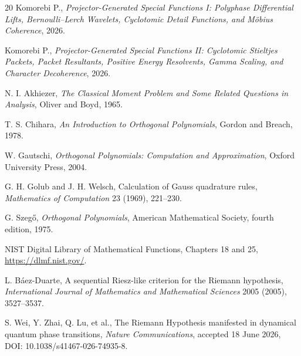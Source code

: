 \documentclass[11pt,openany]{report}
\theoremstyle{definition}
\theoremstyle{remark}
\begin{document}
\begin{thebibliography}{20}
Komorebi P.,
\emph{Projector-Generated Special Functions I: Polyphase Differential Lifts, Bernoulli--Lerch Wavelets, Cyclotomic Detail Functions, and M\"obius Coherence}, 2026.

Komorebi P.,
\emph{Projector-Generated Special Functions II: Cyclotomic Stieltjes Packets, Packet Resultants, Positive Energy Resolvents, Gamma Scaling, and Character Decoherence}, 2026.

N. I. Akhiezer,
\emph{The Classical Moment Problem and Some Related Questions in Analysis},
Oliver and Boyd, 1965.

T. S. Chihara,
\emph{An Introduction to Orthogonal Polynomials},
Gordon and Breach, 1978.

W. Gautschi,
\emph{Orthogonal Polynomials: Computation and Approximation},
Oxford University Press, 2004.

G. H. Golub and J. H. Welsch,
Calculation of Gauss quadrature rules,
\emph{Mathematics of Computation} 23 (1969), 221--230.

G. Szeg\H{o},
\emph{Orthogonal Polynomials},
American Mathematical Society, fourth edition, 1975.

NIST Digital Library of Mathematical Functions,
Chapters 18 and 25,
\url{https://dlmf.nist.gov/}.

L. B\'aez-Duarte,
A sequential Riesz-like criterion for the Riemann hypothesis,
\emph{International Journal of Mathematics and Mathematical Sciences} 2005 (2005), 3527--3537.

S. Wei, Y. Zhai, Q. Lu, et al.,
The Riemann Hypothesis manifested in dynamical quantum phase transitions,
\emph{Nature Communications}, accepted 18 June 2026,
DOI: 10.1038/s41467-026-74935-8.
\end{thebibliography}
\end{document}

